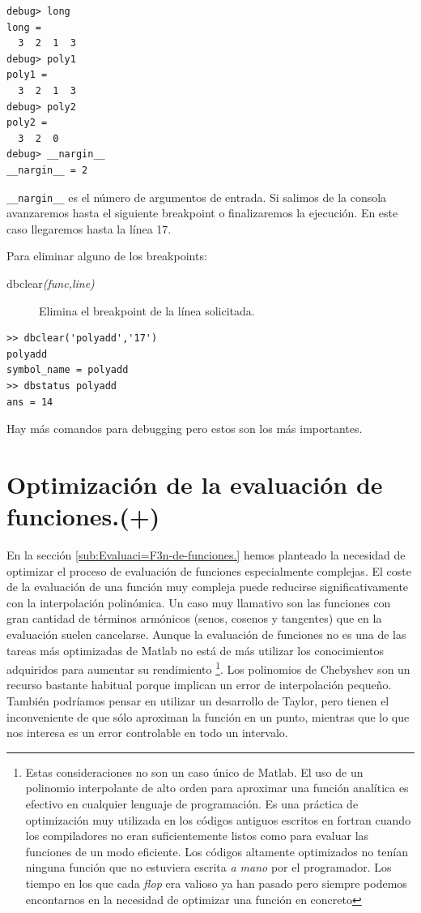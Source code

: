   \begin{verbatim}
debug> long
long =
  3  2  1  3
debug> poly1
poly1 =
  3  2  1  3
debug> poly2
poly2 =
  3  2  0
debug> __nargin__
__nargin__ = 2
\end{verbatim}
\texttt{\_\_nargin\_\_} es el número de argumentos de entrada. Si
salimos de la consola avanzaremos hasta el siguiente breakpoint o
finalizaremos la ejecución. En este caso llegaremos hasta la línea 17.

Para eliminar alguno de los breakpoints:

\begin{description}
\item [{dbclear\textsl{(func,line)}}]Elimina el
  breakpoint de la línea solicitada.
\end{description}
\begin{verbatim}
>> dbclear('polyadd','17')
polyadd
symbol_name = polyadd
>> dbstatus polyadd
ans = 14
\end{verbatim}
Hay más comandos para debugging pero estos son los más importantes.


\section{Optimización de la evaluación de funciones.(+)}

En la sección \ref{sub:Evaluaci=F3n-de-funciones.} hemos planteado la
necesidad de optimizar el proceso de evaluación de funciones
especialmente complejas.  El coste de la evaluación de una función muy
compleja puede reducirse significativamente con la interpolación
polinómica. Un caso muy llamativo son las funciones con gran cantidad
de términos armónicos (senos, cosenos y tangentes) que en la
evaluación suelen cancelarse. Aunque la evaluación de funciones no es
una de las tareas más optimizadas de Matlab no está de más utilizar
los conocimientos adquiridos para aumentar su rendimiento%
\footnote{Estas consideraciones no son un caso único de Matlab. El uso
  de un polinomio interpolante de alto orden para aproximar una
  función analítica es efectivo en cualquier lenguaje de programación.
  Es una práctica de optimización muy utilizada en los códigos
  antiguos escritos en fortran cuando los compiladores no eran
  suficientemente listos como para evaluar las funciones de un modo
  eficiente. Los códigos altamente optimizados no tenían ninguna
  función que no estuviera escrita \emph{a mano} por el programador.
  Los tiempo en los que cada \emph{flop} era valioso ya han pasado
  pero siempre podemos encontarnos en la necesidad de optimizar una
  función en concreto%
}. Los polinomios de Chebyshev son un recurso bastante habitual porque
implican un error de interpolación pequeño. También podríamos pensar
en utilizar un desarrollo de Taylor, pero tienen el inconveniente de
que sólo aproximan la función en un punto, mientras que lo que nos
interesa es un error controlable en todo un intervalo.

